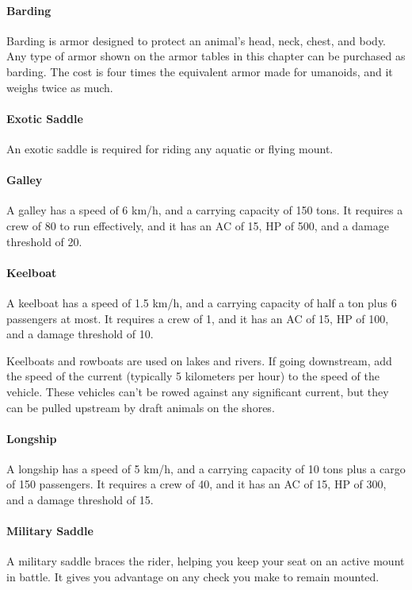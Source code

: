     \paragraph{Barding}
        Barding is armor designed to protect an animal's head, neck, chest, and body.
        Any type of armor shown on the armor tables in this chapter can be purchased as barding.
        The cost is four times the equivalent armor made for umanoids, and it weighs twice as much.
    \paragraph{Exotic Saddle}
        An exotic saddle is required for riding any aquatic or flying mount.
    \paragraph{Galley}
        A galley has a speed of 6 km/h, and a carrying capacity of 150 tons.
        It requires a crew of 80 to run effectively, and it has an AC of 15, HP of 500, and a damage threshold of 20.
    \paragraph{Keelboat}
        A keelboat has a speed of 1.5 km/h, and a carrying capacity of half a ton plus 6 passengers at most.
        It requires a crew of 1, and it has an AC of 15, HP of 100, and a damage threshold of 10.

        Keelboats and rowboats are used on lakes and rivers.
        If going downstream, add the speed of the current (typically 5 kilometers per hour) to the speed of the vehicle.
        These vehicles can't be rowed against any significant current, but they can be pulled upstream by draft animals on the shores.
    \paragraph{Longship}
        A longship has a speed of 5 km/h, and a carrying capacity of 10 tons plus a cargo of 150 passengers.
        It requires a crew of 40, and it has an AC of 15, HP of 300, and a damage threshold of 15.
    \paragraph{Military Saddle}
        A military saddle braces the rider, helping you keep your seat on an active mount in battle.
        It gives you advantage on any check you make to remain mounted.
